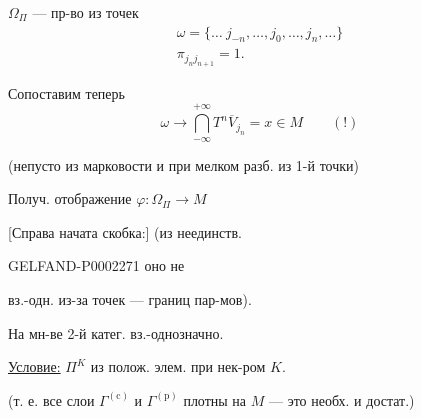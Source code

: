 $\Omega_\Pi$ — пр-во из точек
\begin{equation*}
 \begin{gathered}
 \omega=\{\ldots\ j_{-n},\ldots,j_0,\ldots,j_n,\ldots\}\\
 \pi_{j_nj_{n+1}}=1.
 \end{gathered}
\end{equation*}



Сопоставим теперь
\begin{equation*}
 \omega\longrightarrow\bigcap_{-\infty}^{+\infty}T^n\overline{V}_{j_n}
 =x\in M\qquad(!)
\end{equation*}



(непусто из марковости и при мелком разб. из 1-й точки)



Получ. отображение $\varphi:\Omega_\Pi\longrightarrow M$



[Справа начата скобка:] (из неединств.



\begin{GelfandAdjacentEvidence}{GELFAND-P000227}{1}
оно не
\end{GelfandAdjacentEvidence}

вз.-одн. из-за точек — границ пар-мов).

На мн-ве 2-й катег. вз.-однозначно.



\underline{Условие:} $\Pi^K$ из полож. элем. при нек-ром $K$.



(т. е. все слои $\Gamma^{(\mathrm{c})}$ и $\Gamma^{(\mathrm{p})}$ плотны на $M$ — это необх. и достат.)



